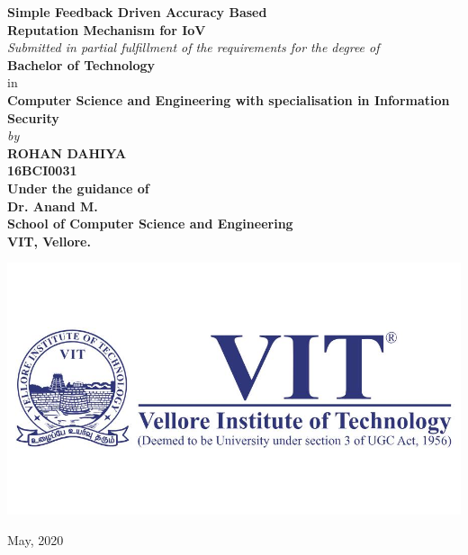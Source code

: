 \documentclass[12pt,a4paper]{article}
\begin{document}
\begin{center}
{\Large \textbf{Simple Feedback Driven Accuracy Based\\ Reputation Mechanism for IoV}}\\
\vspace{2cm}
{\large \textit{Submitted in partial fulfillment of the requirements for the degree of}}\\
\vspace{0.5cm}
{\LARGE \textbf{Bachelor of Technology}} \\
{\large in}\\
{\LARGE \textbf{Computer Science and Engineering with specialisation in Information Security}} \\
\vspace{2cm}
{\large \textit{by}}\\
\vspace{0.2cm}
{\large \textbf{ROHAN DAHIYA}}\\
{\large \textbf{16BCI0031}}\\
\vspace{0.7cm}
{\large \textbf{Under the guidance of}}\\
\vspace{0.2cm}
{\large \textbf{Dr. Anand M.}}\\
{\textbf{School of Computer Science and Engineering}}\\
{\textbf{VIT, Vellore.}}\\
\end{center}
\begin{center}
\vspace{1.2cm}
\includegraphics[scale=0.2]{vellore-institute-of-technology-vit-logo-vector.jpg}

May, 2020\\
\end{center}
\thispagestyle{empty}
\end{document}

